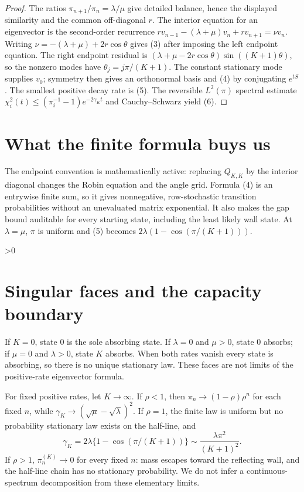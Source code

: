 \documentclass[11pt]{article}
\begin{document}
\begin{proof}
The ratios $\pi_{n+1}/\pi_n=\lambda/\mu$ give detailed balance, hence the
displayed similarity and the common off-diagonal $r$.  The interior equation
for an eigenvector is the second-order recurrence
$r v_{n-1}-(\lambda+\mu)v_n+r v_{n+1}=\nu v_n$.
Writing $\nu=-(\lambda+\mu)+2r\cos\theta$ gives (3) after imposing the
left endpoint equation.  The right endpoint residual is
$(\lambda+\mu-2r\cos\theta)\sin((K+1)\theta)$, so the nonzero modes have
$\theta_j=j\pi/(K+1)$.  The constant stationary mode supplies $v_0$; symmetry
then gives an orthonormal basis and (4) by conjugating $e^{tS}$.  The smallest
positive decay rate is (5).  The reversible $L^2(\pi)$ spectral estimate
$\chi_i^2(t)\leq(\pi_i^{-1}-1)e^{-2\gamma_Kt}$ and Cauchy--Schwarz yield
(6).
\end{proof}

\section{What the finite formula buys us}
The endpoint convention is mathematically active: replacing $Q_{K,K}$ by the
interior diagonal changes the Robin equation and the angle grid.  Formula (4)
is an entrywise finite sum, so it gives nonnegative, row-stochastic transition
probabilities without an unevaluated matrix exponential.  It also makes the
gap bound auditable for every starting state, including the least likely wall
state.  At $\lambda=\mu$, $\pi$ is uniform and (5) becomes
$2\lambda(1-\cos(\pi/(K+1)))$.

\ifnum\CRevisionRound>0
\section{Singular faces and the capacity boundary}
If $K=0$, state $0$ is the sole absorbing state.  If $\lambda=0$ and $\mu>0$,
state $0$ absorbs; if $\mu=0$ and $\lambda>0$, state $K$ absorbs.  When both
rates vanish every state is absorbing, so there is no unique stationary law.
These faces are not limits of the positive-rate eigenvector formula.

For fixed positive rates, let $K\to\infty$.  If $\rho<1$, then
$\pi_n\to(1-\rho)\rho^n$ for each fixed $n$, while
$\gamma_K\to(\sqrt\mu-\sqrt\lambda)^2$.  If $\rho=1$, the finite law is
uniform but no probability stationary law exists on the half-line, and
\[
 \gamma_K=2\lambda\{1-\cos(\pi/(K+1))\}
 \sim \frac{\lambda\pi^2}{(K+1)^2}.                     \tag{7}
\]
If $\rho>1$, $\pi_n^{(K)}\to0$ for every fixed $n$: mass escapes toward the
reflecting wall, and the half-line chain has no stationary probability.  We do
not infer a continuous-spectrum decomposition from these elementary limits.
\fi
\end{document}

